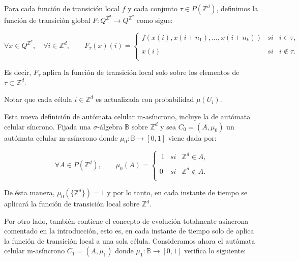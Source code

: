 \documentclass[../proyecto.tex]{memoir}
\begin{document}
\begin{defi}
Para cada función de transición local $f$ y cada conjunto $\tau \in P(\mathds{Z}^{d})$, definimos la función de transición global $F:Q^{\mathds{Z}^{d}} \rightarrow Q^{\mathds{Z}^{d}}$ como sigue:

\begin{equation*}
	\forall x \in Q^{\mathds{Z}^{d}}, \quad \forall i \in \mathds{Z}^{d}, \qquad
	F_{\tau}(x)(i) = \left\{ \begin{array}{lcc}
             f(x(i),x(i+n_{1}),...,x(i+n_{k})) &   si  & i \in \tau ,\\
             \\ x(i) & si  & i \notin \tau .\\
             \end{array}
             \right.
\end{equation*}

Es decir, $F_{\tau}$ aplica la función de transición local solo sobre los elementos de $\tau \subset \mathds{Z}^{d}$. 
\end{defi}

Notar que cada célula $i \in \mathds{Z}^{d}$ es actualizada con probabilidad $\mu(U_{i})$.

Esta nueva definición de autómata celular m-asíncrono, incluye la de autómata celular síncrono. Fijada una $\sigma$-álgebra $\mathds{B}$ sobre $\mathds{Z}^{d}$ y sea $C_{0}=(A, \mu_{0})$ un autómata celular m-asíncrono donde $\mu_{0}: \mathds{B} \rightarrow [0,1]$ viene dada por: 

\begin{equation*}
	 \forall A \in P(\mathds{Z}^{d}), \qquad 
	 \mu_{0}(A) = \left\{ \begin{array}{lcc}
             \ 1 &   si  & \mathds{Z}^{d} \in A ,\\
             \\0 &   si  & \mathds{Z}^{d} \notin A .\\
             \end{array}
             \right.
\end{equation*}

De ésta manera, $\mu_{0}(\{\mathds{Z}^{d}\})=1$ y por lo tanto, en cada instante de tiempo se aplicará la función de transición local sobre $\mathds{Z}^{d}$.

Por otro lado, también contiene el concepto de evolución totalmente asíncrona comentado en la introducción, esto es, en cada instante de tiempo solo de aplica la función de transición local a una sola célula. Consideramos ahora el autómata celular m-asíncrono $C_{1}=(A, \mu_{1})$ donde $\mu_{1}: \mathds{B} \rightarrow [0,1]$ verifica lo siguiente:
\end{document}
